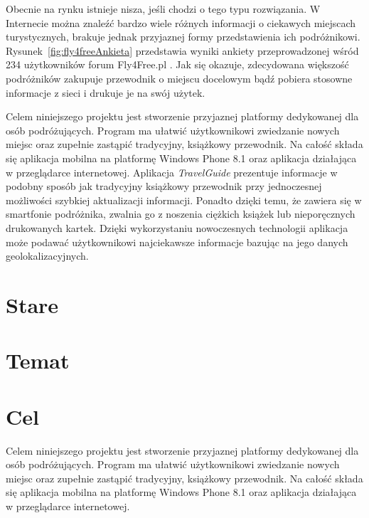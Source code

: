 \documentclass{book}
\newcommand{\appName}{\emph{TravelGuide} }
\begin{document}
			Obecnie na rynku istnieje nisza, jeśli chodzi o tego typu rozwiązania. W Internecie można znaleźć bardzo wiele różnych informacji o ciekawych miejscach turystycznych, brakuje jednak przyjaznej formy przedstawienia ich podróżnikowi. 
			Rysunek~\ref{fig:fly4freeAnkieta} przedstawia wyniki ankiety przeprowadzonej wśród 234 użytkowników forum Fly4Free.pl \cite{id:fly4free}. Jak się okazuje, zdecydowana większość podróżników zakupuje przewodnik o miejscu docelowym bądź pobiera stosowne informacje z sieci i drukuje je na swój użytek.
			
			Celem niniejszego projektu jest stworzenie przyjaznej platformy dedykowanej dla osób podróżujących. Program ma ułatwić użytkownikowi zwiedzanie nowych miejsc oraz zupełnie zastąpić tradycyjny, książkowy przewodnik. Na całość składa się aplikacja mobilna na platformę Windows Phone 8.1 oraz aplikacja działająca w przeglądarce internetowej. 
			Aplikacja \appName prezentuje informacje w podobny sposób jak tradycyjny książkowy przewodnik przy jednoczesnej możliwości szybkiej aktualizacji informacji. Ponadto dzięki temu, że zawiera się w smartfonie podróżnika, zwalnia go z noszenia ciężkich książek lub nieporęcznych drukowanych kartek. 
			Dzięki wykorzystaniu nowoczesnych technologii aplikacja może podawać użytkownikowi najciekawsze informacje bazując na jego danych geolokalizacyjnych. 
		
	
			
	
	
	
	    \section{Stare}
	
		\section{Temat}
	
		\section{Cel}
		Celem niniejszego projektu jest stworzenie przyjaznej platformy dedykowanej dla osób podróżujących. Program ma ułatwić użytkownikowi zwiedzanie nowych miejsc oraz zupełnie zastąpić tradycyjny, książkowy przewodnik. Na całość składa się aplikacja mobilna na platformę Windows Phone 8.1 oraz aplikacja działająca w przeglądarce internetowej. 
\end{document}
